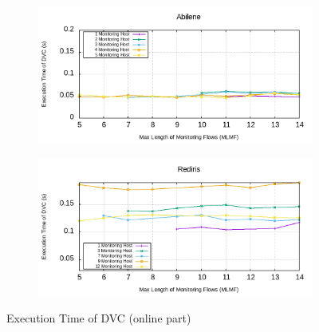 \documentclass[10pt, journal, letterpaper]{IEEEtran}
\begin{document}
\begin{figure}
    \begin{subfigure}{0.49\columnwidth}
       \centering
        \includegraphics[width=\columnwidth]{img/eval_Abilene_Max_Length_of_Routes_Execution_time_PSO.png}
    \end{subfigure}
    \begin{subfigure}{0.49\columnwidth}
      \centering
      \includegraphics[width=\columnwidth]{img/eval_Rediris_Max_Length_of_Routes_Execution_time_PSO.png}
    \end{subfigure}
    \caption{Execution Time of DVC (online part)}
    \label{fig:Abilene_time_DMI}
\end{figure} 
\end{document}

